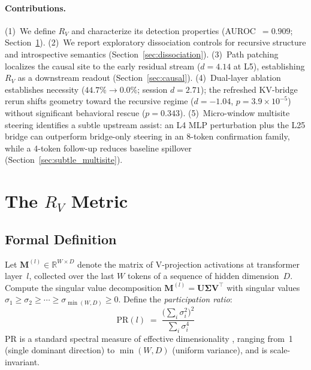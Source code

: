 \documentclass{article}
\newcommand{\RV}{R_V}
\newcommand{\PR}{\text{PR}}
\newcommand{\dcohen}{d}
\begin{document}
\paragraph{Contributions.}
(1)~We define $\RV$ and characterize its detection properties (AUROC~$= 0.909$;
Section~\ref{sec:metric}).
(2)~We report exploratory dissociation controls for recursive structure and introspective semantics
(Section~\ref{sec:dissociation}).
(3)~Path patching localizes the causal site to the early residual stream ($\dcohen = 4.14$ at L5),
establishing $\RV$ as a downstream readout (Section~\ref{sec:causal}).
(4)~Dual-layer ablation establishes necessity ($44.7\% \to 0.0\%$; session $\dcohen = 2.71$);
the refreshed KV-bridge rerun shifts geometry toward the recursive regime
($\dcohen = -1.04$, $p = 3.9 \times 10^{-5}$) without significant behavioral rescue
($p = 0.343$).
(5)~Micro-window multisite steering identifies a subtle upstream assist:
an L4 MLP perturbation plus the L25 bridge can outperform bridge-only steering in an
8-token confirmation family, while a 4-token follow-up reduces baseline spillover
(Section~\ref{sec:subtle_multisite}).


\section{The $\RV$ Metric}
\label{sec:metric}

\subsection{Formal Definition}

Let $\mathbf{M}^{(l)} \in \mathbb{R}^{W \times D}$ denote the matrix of V-projection activations at
transformer layer~$l$, collected over the last $W$ tokens of a sequence of hidden dimension~$D$.
Compute the singular value decomposition $\mathbf{M}^{(l)} = \mathbf{U} \boldsymbol{\Sigma} \mathbf{V}^\top$
with singular values $\sigma_1 \geq \sigma_2 \geq \cdots \geq \sigma_{\min(W,D)} \geq 0$.
Define the \emph{participation ratio}:
\begin{equation}
    \PR(l) \;=\; \frac{\bigl(\sum_i \sigma_i^2\bigr)^2}{\sum_i \sigma_i^4}
    \label{eq:pr}
\end{equation}
$\PR$ is a standard spectral measure of effective dimensionality \citep{gao2017theory,
roy2007effective}, ranging from~1 (single dominant direction) to $\min(W, D)$ (uniform variance),
and is scale-invariant.
\end{document}
